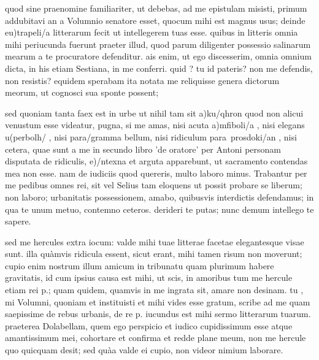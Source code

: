 


 quod sine praenomine familiariter, ut debebas, ad me epistulam misisti, primum addubitavi an a Volumnio senatore esset, quocum mihi est magnus usus; deinde eu)trapeli/a litterarum fecit ut intellegerem tuas esse. quibus in litteris omnia mihi periucunda fuerunt praeter illud, quod parum diligenter possessio salinarum mearum a te procuratore defenditur. ais enim, ut ego discesserim, omnia omnium dicta, in his etiam Sestiana, in me conferri. quid ? tu id pateris? non me defendis, non resistis? equidem sperabam ita notata me reliquisse genera dictorum meorum, ut cognosci sua sponte possent;

 sed quoniam tanta faex est in urbe ut nihil tam sit a)ku/qhron quod non alicui venustum esse videatur, pugna, si me amas, nisi acuta a)mfiboli/a , nisi elegans u(perbolh/ , nisi para/gramma bellum, nisi ridiculum para\ prosdoki/an , nisi cetera, quae sunt a me in secundo libro 'de oratore' per Antoni personam disputata de ridiculis, e)/ntexna et arguta apparebunt, ut sacramento contendas mea non esse. nam de iudiciis quod quereris, multo laboro minus. Trabantur per me pedibus omnes rei, sit vel Selius tam eloquens ut possit probare se liberum; non laboro; urbanitatis possessionem, amabo, quibusvis interdictis defendamus; in qua te unum metuo, contemno ceteros. derideri te putas; nunc demum intellego te sapere.

 sed me hercules extra iocum: valde mihi tuae litterae facetae elegantesque visae sunt. illa quàmvis ridicula essent, sicut erant, mihi tamen risum non moverunt; cupio enim nostrum illum amicum in tribunatu quam plurimum habere gravitatis, id cum ipsius causa est mihi, ut scis, in amoribus tum me hercule etiam rei p.; quam quidem, quamvis in me ingrata sit, amare non desinam. tu , mi Volumni, quoniam et instituisti et mihi vides esse gratum, scribe ad me quam saepissime de rebus urbanis, de re p. iucundus est mihi sermo litterarum tuarum. praeterea Dolabellam, quem ego perspicio et iudico cupidissimum esse atque amantissimum mei, cohortare et confirma et redde plane meum, non me hercule quo quicquam desit; sed quàa valde ei cupio, non videor nimium laborare.
